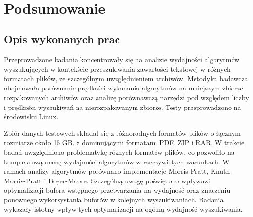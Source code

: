 
\chapter{Podsumowanie}



\section{Opis wykonanych prac}

Przeprowadzone badania koncentrowały się na analizie wydajności algorytmów 
wyszukujących w kontekście przeszukiwania zawartości tekstowej w różnych formatach 
plików, ze szczególnym uwzględnieniem archiwów. Metodyka badawcza obejmowała porównanie
prędkości wykonania algorytmów na mniejszym zbiorze rozpakowanych archiwów oraz 
analizę porównawczą narzędzi pod względem liczby i prędkości wyszukiwań na 
nierozpakowanym zbiorze. Testy przeprowadzono na środowisku Linux.
 
Zbiór danych testowych składał się z różnorodnych formatów plików o łącznym 
rozmiarze około 15 GB, z dominującymi formatami PDF, ZIP i RAR. W trakcie badań
uwzględniono problematykę różnych formatów plików, co pozwoliło na kompleksową
ocenę wydajności algorytmów w rzeczywistych warunkach. W ramach analizy
algorytmów porównano implementacje Morris-Pratt, Knuth-Morris-Pratt i Boyer-Moore.
Szczególną uwagę poświęcono wpływowi optymalizacji bufora wstępnego przetwarzania
na wydajność oraz znaczeniu ponownego wykorzystania buforów w kolejnych wyszukiwaniach.
Badania wykazały istotny wpływ tych optymalizacji na ogólną wydajność wyszukiwania.

